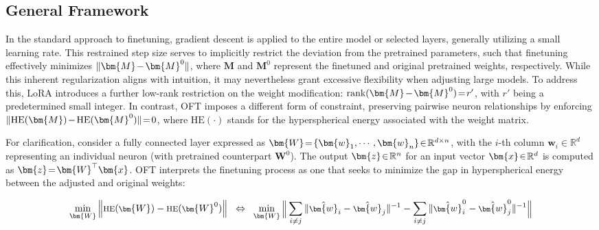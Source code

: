 \subsection{General Framework}

In the standard approach to finetuning, gradient descent is applied to the entire model or selected layers, generally utilizing a small learning rate. This restrained step size serves to implicitly restrict the deviation from the pretrained parameters, such that finetuning effectively minimizes $\thickmuskip=2mu \medmuskip=2mu \| \bm{M} - \bm{M}^0\|$, where $\bm{M}$ and $\bm{M}^0$ represent the finetuned and original pretrained weights, respectively. While this inherent regularization aligns with intuition, it may nevertheless grant excessive flexibility when adjusting large models. To address this, LoRA introduces a further low-rank restriction on the weight modification: $\thickmuskip=2mu \medmuskip=2mu \text{rank}(\bm{M} - \bm{M}^0)=r'$, with $r'$ being a predetermined small integer. In contrast, OFT imposes a different form of constraint, preserving pairwise neuron relationships by enforcing $\thickmuskip=2mu \medmuskip=2mu \| \text{HE}(\bm{M})-\text{HE}(\bm{M}^0) \|=0$, where $\text{HE}(\cdot)$ stands for the hyperspherical energy associated with the weight matrix.

For clarification, consider a fully connected layer expressed as $\thickmuskip=2mu \medmuskip=2mu \bm{W}=\{\bm{w}_1,\cdots,\bm{w}_n\}\in\mathbb{R}^{d\times n}$, with the $i$-th column $\bm{w}_i\in\mathbb{R}^{d}$ representing an individual neuron (with pretrained counterpart $\bm{W}^0$). The output $\thickmuskip=2mu \medmuskip=2mu \bm{z}\in\mathbb{R}^n$ for an input vector $\thickmuskip=2mu \medmuskip=2mu \bm{x}\in\mathbb{R}^d$ is computed as $\thickmuskip=2mu \medmuskip=2mu \bm{z}=\bm{W}^\top\bm{x}$. OFT interprets the finetuning process as one that seeks to minimize the gap in hyperspherical energy between the adjusted and original weights:

\begin{equation}\label{eq:oft_principle}
\footnotesize
\min_{\bm{W}} \left\| \text{HE}(\bm{W})-\text{HE}(\bm{W}^0)\right\|~~\Leftrightarrow~~\min_{\bm{W}} \bigg{\|} \sum_{i\neq j} \|\hat{\bm{w}}_i-\hat{\bm{w}}_j\|^{-1}-\sum_{i\neq j} \|\hat{\bm{w}}^0_i-\hat{\bm{w}}^0_j\|^{-1}\bigg{\|}
\end{equation}

